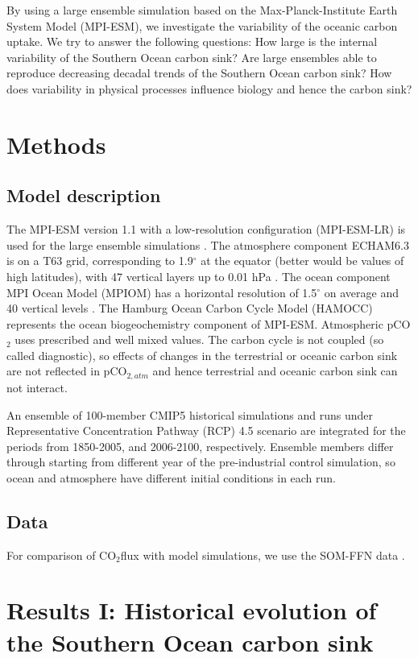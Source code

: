 \documentclass[12pt]{article}
\begin{document}
By using a large ensemble simulation based on the Max-Planck-Institute Earth System Model (MPI-ESM), we investigate the variability of the oceanic carbon uptake. We try to answer the following questions: How large is the internal variability of the Southern Ocean carbon sink? Are large ensembles able to reproduce decreasing decadal trends of the Southern Ocean carbon sink? How does variability in physical processes influence biology and hence the carbon sink?


\section{Methods}

\subsection{Model description}
The MPI-ESM version 1.1 with a low-resolution configuration (MPI-ESM-LR) is used for the large ensemble simulations \citep{Giorgetta2013}. The atmosphere component ECHAM6.3 is on a T63 grid, corresponding to 1.9$^\circ$ at the equator (better would be values of high latitudes), with 47 vertical layers up to 0.01 hPa \citep{Stevens2013}. The ocean component MPI Ocean Model (MPIOM) has a horizontal resolution of 1.5$^\circ$ on average and 40 vertical levels \citep{Jungclaus2013}. The Hamburg Ocean Carbon Cycle Model (HAMOCC) \citep{Ilyina2013} represents the ocean biogeochemistry component of MPI-ESM. 
Atmospheric pCO$_2$ uses prescribed and well mixed values. The carbon cycle is not coupled (so called diagnostic), so effects of changes in the terrestrial or oceanic carbon sink are not reflected in pCO$_{2,atm}$ and hence terrestrial and oceanic carbon sink can not interact.
   
An ensemble of 100-member CMIP5 historical simulations and runs under  Representative Concentration Pathway (RCP) 4.5 scenario are integrated for the periods from 1850-2005, and 2006-2100, respectively. Ensemble members differ through starting from different year of the pre-industrial control simulation, so ocean and atmosphere have different initial conditions in each run.  

\subsection{Data}
For comparison of CO$_2$flux with model simulations, we use the SOM-FFN data \citep{landschuetzer2015}.


\section{Results I: Historical evolution of the Southern Ocean carbon sink}
\end{document}
